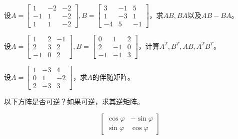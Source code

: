 \begin{ex} \label{ex:3.3}
设$A = \begin{bmatrix} 1 & -2 & -2 \\ -1 & 1 & -2 \\ 1 & 1 & -2 \end{bmatrix}, B = \begin{bmatrix} 3 & -1 & 5 \\ 1 & -3 & 1 \\ -4 & 5 & -1 \end{bmatrix}$，求$AB,BA$以及$AB-BA$。
\end{ex}

\begin{ex} \label{ex:3.4}
设$A = \begin{bmatrix} 1 & 2 & -1 \\ 2 & 3 & 2 \\ -1 & 0 & 2 \end{bmatrix}, B = \begin{bmatrix} 0 & 1 & 2 \\ 2 & -1 & 0 \\ -1 & -1 & 3 \end{bmatrix}$，计算$A^T,B^T,AB,A^TB^T$。
\end{ex}

\begin{ex} \label{ex:3.5}
设$A = \begin{bmatrix} 1 & -3 & 4 \\ 0 & 1 & -2 \\ 2 & -3 & 3 \end{bmatrix}$，求$A$的伴随矩阵。
\end{ex}

\begin{ex} \label{ex:3.6}
以下方阵是否可逆？如果可逆，求其逆矩阵。

$$\begin{bmatrix} \cos\varphi & -\sin\varphi \\ \sin\varphi & \cos\varphi \end{bmatrix}$$
\end{ex}


